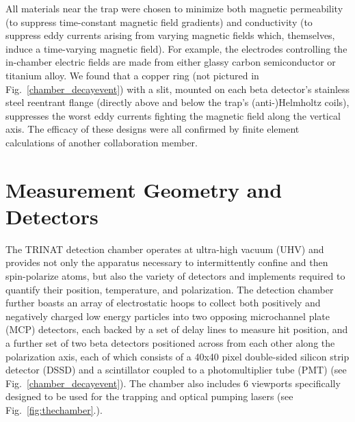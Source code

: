 All materials near the trap were chosen to minimize both magnetic permeability (to suppress time-constant magnetic field gradients) and conductivity (to suppress eddy currents arising from varying magnetic fields which, themselves, induce a time-varying magnetic field).  For example, the electrodes controlling the in-chamber electric fields are made from either glassy carbon semiconductor or titanium alloy.  We found that a 
copper ring (not pictured in Fig.~\ref{chamber_decayevent}) with a slit, mounted on each beta detector's stainless steel reentrant flange (directly above and below the trap's (anti-)Helmholtz coils), suppresses the worst eddy currents fighting the magnetic field along the vertical axis. The efficacy of these designs were all confirmed by finite element calculations of another collaboration member.



\section{Measurement Geometry and Detectors}
\label{sec:geometry}
The TRINAT detection chamber operates at ultra-high vacuum (UHV) and provides not only the apparatus necessary to intermittently confine and then spin-polarize atoms, but also the variety of detectors and implements required to quantify their position, temperature, and polarization.  The detection chamber further boasts an array of electrostatic hoops to collect both positively and negatively charged low energy particles into two opposing microchannel plate (MCP) detectors, each backed by a set of delay lines to measure hit position, and a further set of two beta detectors positioned across from each other along the polarization axis, each of which consists of a 40x40 pixel double-sided silicon strip detector (DSSD) and a scintillator coupled to a photomultiplier tube (PMT) 
(see Fig.~\ref{chamber_decayevent}). The chamber also includes 6 viewports specifically designed to be used for the trapping and optical pumping lasers (see Fig.~\ref{fig:thechamber}.).


